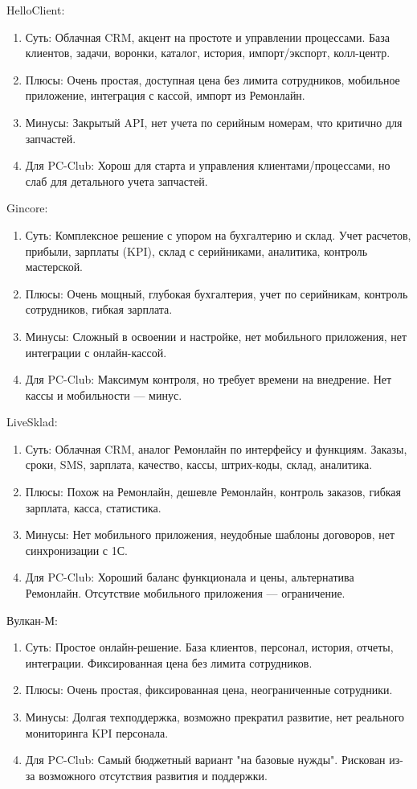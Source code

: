 HelloClient:
\begin{enumerate}
	\item Суть: Облачная CRM, акцент на простоте и управлении процессами. База клиентов, задачи, воронки, каталог, история, импорт/экспорт, колл-центр.
	\item Плюсы: Очень простая, доступная цена без лимита сотрудников, мобильное приложение, интеграция с кассой, импорт из Ремонлайн.
	\item Минусы: Закрытый API, нет учета по серийным номерам, что критично для запчастей.
	\item Для PC-Club: Хорош для старта и управления клиентами/процессами, но слаб для детального учета запчастей.
\end{enumerate}

Gincore:
\begin{enumerate}
	\item Суть: Комплексное решение с упором на бухгалтерию и склад. Учет расчетов, прибыли, зарплаты (KPI), склад с серийниками, аналитика, контроль мастерской.
	\item Плюсы: Очень мощный, глубокая бухгалтерия, учет по серийникам, контроль сотрудников, гибкая зарплата.
	\item Минусы: Сложный в освоении и настройке, нет мобильного приложения, нет интеграции с онлайн-кассой.
	\item Для PC-Club: Максимум контроля, но требует времени на внедрение. Нет кассы и мобильности — минус.
\end{enumerate}

LiveSklad:
\begin{enumerate}
	\item Суть: Облачная CRM, аналог Ремонлайн по интерфейсу и функциям. Заказы, сроки, SMS, зарплата, качество, кассы, штрих-коды, склад, аналитика.
	\item Плюсы: Похож на Ремонлайн, дешевле Ремонлайн, контроль заказов, гибкая зарплата, касса, статистика.
	\item Минусы: Нет мобильного приложения, неудобные шаблоны договоров, нет синхронизации с 1С.
	\item Для PC-Club: Хороший баланс функционала и цены, альтернатива Ремонлайн. Отсутствие мобильного приложения — ограничение.
\end{enumerate}

Вулкан-М:
\begin{enumerate}
	\item Суть: Простое онлайн-решение. База клиентов, персонал, история, отчеты, интеграции. Фиксированная цена без лимита сотрудников.
	\item Плюсы: Очень простая, фиксированная цена, неограниченные сотрудники.
	\item Минусы: Долгая техподдержка, возможно прекратил развитие, нет реального мониторинга KPI персонала.
	\item Для PC-Club: Самый бюджетный вариант "на базовые нужды". Рискован из-за возможного отсутствия развития и поддержки.
\end{enumerate}

